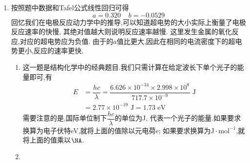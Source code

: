 \documentclass{ctexart}
\begin{document}
\begin{solution}
    \begin{enumerate}[label=\tbf{\arabic{Pcounter}-\arabic*},topsep=0pt,parsep=0pt,itemsep=0pt,partopsep=0pt]
        \item 按照题中数据和Tafel公式线性回归可得
            \[a=0.320\ \ \ \ \ b=-0.0529\]
            回忆我们在电极反应动力学中的推导,可以知道超电势的大小实际上衡量了电极反应速率的快慢,%
            其绝对值越大则说明反应速率越慢.%
            这里发生金属的氧化反应,对应的超电势应为负值.%
            由于的$a$值比更大,因此在相同的电流密度下的超电势更小,反应的速率更快.
        \begin{enumerate}[label=\tbf{\arabic{Pcounter}-2-\arabic*},topsep=0pt,parsep=0pt,itemsep=0pt,partopsep=0pt,leftmargin=10pt]
            \item 这一题是结构化学中的经典题目.我们只需计算在给定波长下单个光子的能量即可,有
                \[\begin{aligned}
                    E
                    &= \dfrac{hc}{\lambda}=\dfrac{6.626\times10^{-34}\times2.998\times10^{8}}{717.7\times10^{-9}}\text{ J} \\
                    &= 2.77\times10^{-19}\text{ J} = 1.73\text{ eV}
                \end{aligned}\]
                需要注意的是,国际单位制下$\dfrac{hc}{\lambda}$的单位为J,%
                代表一个光子的能量.如果要求换算为电子伏特eV,就将上面的值除以元电荷e;%
                如果要求换算为$\text{J}\cdot\text{mol}^{-1}$,就将上面的值乘以$\NA$.
            \item 
                
                
        \end{enumerate}
    \end{enumerate}
\end{solution}
\end{document}
